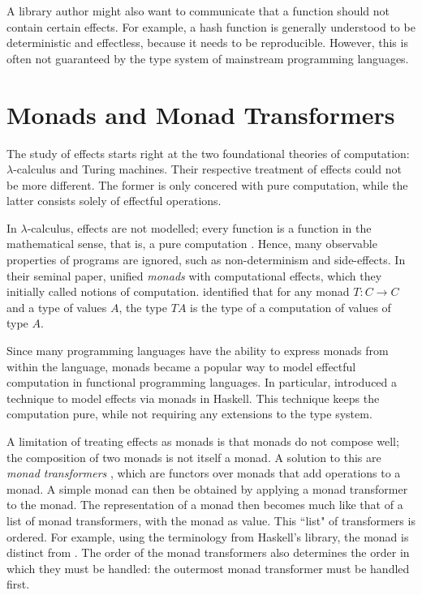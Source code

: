 A library author might also want to communicate that a function should not contain certain effects. For example, a hash function is generally understood to be deterministic and effectless, because it needs to be reproducible. However, this is often not guaranteed by the type system of mainstream programming languages.\citationneeded{}

\section{Monads and Monad Transformers}

The study of effects starts right at the two foundational theories of computation: $\lambda$-calculus and Turing machines. Their respective treatment of effects could not be more different. The former is only concered with pure computation, while the latter consists solely of effectful operations.

In $\lambda$-calculus, effects are not modelled; every function is a function in the mathematical sense, that is, a pure computation \autocite{moggi_computational_1989}. Hence, many observable properties of programs are ignored, such as non-determinism and side-effects. In their seminal paper, \textcite{moggi_computational_1989} unified \emph{monads} with computational effects, which they initially called notions of computation. \citeauthor{moggi_computational_1989} identified that for any monad $T: C \to C$ and a type of values $A$, the type $T A$ is the type of a computation of values of type $A$.

Since many programming languages have the ability to express monads from within the language, monads became a popular way to model effectful computation in functional programming languages. In particular, \textcite{peyton_jones_imperative_1993} introduced a technique to model effects via monads in Haskell. This technique keeps the computation pure, while not requiring any extensions to the type system.

A limitation of treating effects as monads is that monads do not compose well; the composition of two monads is not itself a monad. A solution to this are \emph{monad transformers} \autocite{moggi_abstract_1989}, which are functors over monads that add operations to a monad. A simple monad can then be obtained by applying a monad transformer to the  monad. The representation of a monad then becomes much like that of a list of monad transformers, with the  monad as  value. This ``list" of transformers is ordered. For example, using the terminology from Haskell's  library, the monad  is distinct from . The order of the monad transformers also determines the order in which they must be handled: the outermost monad transformer must be handled first.

